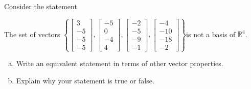 
\begin{exerciseStatement}


Consider the statement 
\begin{center}\begin{minipage}{0.8\textwidth}
 The set of vectors \( \left\{ \left[\begin{array}{c}
3 \\
-5 \\
-5 \\
-5
\end{array}\right] , \left[\begin{array}{c}
-5 \\
0 \\
-4 \\
4
\end{array}\right] , \left[\begin{array}{c}
-2 \\
-5 \\
-9 \\
-1
\end{array}\right] , \left[\begin{array}{c}
-4 \\
-10 \\
-18 \\
-2
\end{array}\right] \right\} \)is not a basis of \(\mathbb{R}^4\). 
\end{minipage}\end{center}
    


\begin{enumerate}[(a)]
\item  Write an equivalent statement in terms of other vector properties.
\item  Explain why your statement is true or false.
\end{enumerate}
    
\end{exerciseStatement}
    
